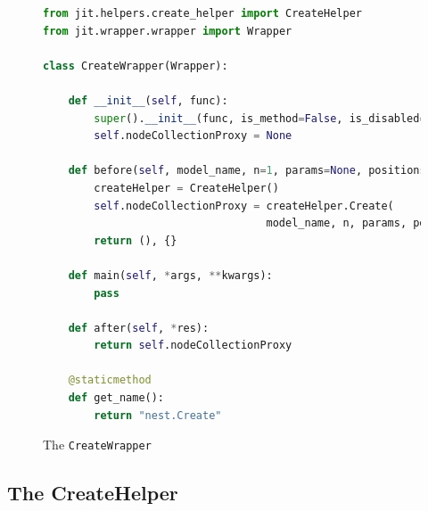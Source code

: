 \begin{figure}[ht!]
    \centering
    \begin{lstlisting}[language=Python, label=fig:create_wrapper]
from jit.helpers.create_helper import CreateHelper
from jit.wrapper.wrapper import Wrapper

class CreateWrapper(Wrapper):

    def __init__(self, func):
        super().__init__(func, is_method=False, is_disabled=False)
        self.nodeCollectionProxy = None
        
    def before(self, model_name, n=1, params=None, positions=None):
        createHelper = CreateHelper()
        self.nodeCollectionProxy = createHelper.Create(
                                   model_name, n, params, positions)
        return (), {}
    
    def main(self, *args, **kwargs):
        pass
    
    def after(self, *res):
        return self.nodeCollectionProxy
    
    @staticmethod
    def get_name():
        return "nest.Create"
\end{lstlisting}
    \caption{The \texttt{CreateWrapper}}
    \label{fig:create_wrapper}
\end{figure}




\subsection{The CreateHelper}

